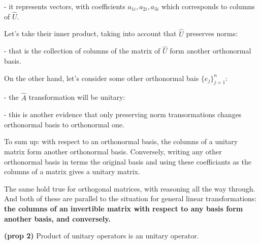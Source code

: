 \documentclass{article}
\begin{document}

- it represents vectors, with coefficients $a_{1i}, a_{2i}, a_{3i}$ which corresponds to columns of $\hat{U}$.

Let's take their inner product, taking into account that $\hat{U}$ preserves norms:



- that is the collection of columns of the matrix of $\hat{U}$ form another orthonormal basis.

On the other hand, let's consider some other orthonormal bais $\lbrace e_j \rbrace^n_{j=1} $:


- the $\hat{A}$ transformation will be unitary:


- this is another evidence that only preserving norm transormations changes orthonormal basis to orthonormal one.

To sum up: with respect to an orthonormal basis, the columns of a unitary matrix form another orthonormal basis.
Conversely, writing any other orthonormal basis in terms the original basis and using these coefficiants as the columns of a matrix gives a unitary matrix.

The same hold true for orthogonal matrices, with reasoning all the way through. And both of these are parallel to the situation for general linear transformations: \textbf{the columns of an invertible matrix with respect to any basis form another basis, and conversely. }


\skl

\textbf{(prop 2)} Product of unitary operators is an unitary operator.

\end{document}
